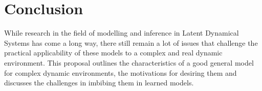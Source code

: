 \documentclass[10pt,twocolumn,letterpaper]{article}
\begin{document}
	\section{Conclusion}
	While research in the field of modelling and inference in Latent Dynamical Systems has come a long way, there still remain a lot of issues that challenge the practical applicability of these models to a complex and real dynamic environment. This proposal outlines the characteristics of a good general model for complex dynamic environments, the motivations for desiring them and discusses the challenges in imbibing them in learned models.
	
	
	
	
\end{document}
